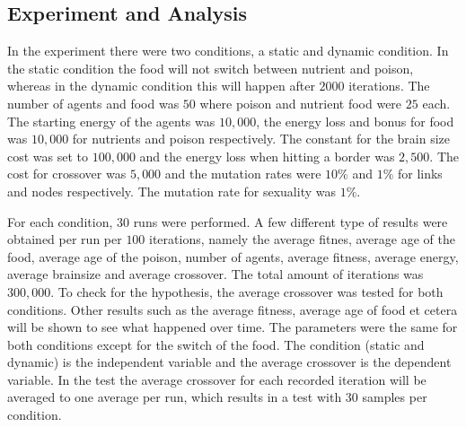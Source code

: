 \subsection{Experiment and Analysis}
In the experiment there were two conditions, a static and dynamic condition.
In the static condition the food will not switch between nutrient and poison, whereas in the dynamic condition this will happen after $2000$ iterations.
The number of agents and food was $50$ where poison and nutrient food were $25$ each.
The starting energy of the agents was $10,000$, the energy loss and bonus for food was $10,000$ for nutrients and poison respectively.
The constant for the brain size cost was set to $100,000$ and the energy loss when hitting a border was $2,500$.
The cost for crossover was $5,000$ and the mutation rates were $10\%$ and $1\%$ for links and nodes respectively.
The mutation rate for sexuality was $1\%$.

For each condition, $30$ runs were performed.
A few different type of results were obtained per run per $100$ iterations, namely the average fitnes, average age of the food, average age of the poison, number of agents, average fitness, average energy, average brainsize and average crossover.
The total amount of iterations was $300,000$.
To check for the hypothesis, the average crossover was tested for both conditions.
Other results such as the average fitness, average age of food et cetera will be shown to see what happened over time.
The parameters were the same for both conditions except for the switch of the food.
The condition (static and dynamic) is the independent variable and the average crossover is the dependent variable.
In the test the average crossover for each recorded iteration will be averaged to one average per run, which results in a test with $30$ samples per condition.